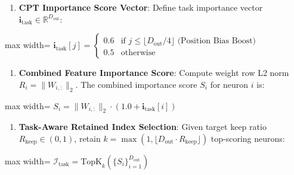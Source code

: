 \begin{enumerate}
\item \textbf{CPT Importance Score Vector}:
Define task importance vector $\mathbf{i}_{\text{task}} \in \mathbb{R}^{D_{\text{out}}}$:
\end{enumerate}
\begin{center}
\begin{adjustbox}{max width=\columnwidth}
$\displaystyle
\mathbf{i}_{\text{task}}[j] = \begin{cases} 0.6 & \text{if } j \le \lfloor D_{\text{out}} / 4 \rfloor \text{ (Position Bias Boost)} \\ 0.5 & \text{otherwise} \end{cases}
$
\end{adjustbox}
\end{center}

\begin{enumerate}
\item \textbf{Combined Feature Importance Score}:
Compute weight row L2 norm $R_i = \| W_{i, :} \|_2$. The combined importance score $S_i$ for neuron $i$ is:
\end{enumerate}
\begin{center}
\begin{adjustbox}{max width=\columnwidth}
$\displaystyle
S_i = \| W_{i, :} \|_2 \cdot \left( 1.0 + \mathbf{i}_{\text{task}}[i] \right)
$
\end{adjustbox}
\end{center}

\begin{enumerate}
\item \textbf{Task-Aware Retained Index Selection}:
Given target keep ratio $R_{\text{keep}} \in (0, 1)$, retain $k = \max(1, \lfloor D_{\text{out}} \cdot R_{\text{keep}} \rfloor)$ top-scoring neurons:
\end{enumerate}
\begin{center}
\begin{adjustbox}{max width=\columnwidth}
$\displaystyle
\mathcal{I}_{\text{task}} = \text{TopK}_k\left( \{ S_i \}_{i=1}^{D_{\text{out}}} \right)
$
\end{adjustbox}
\end{center}

